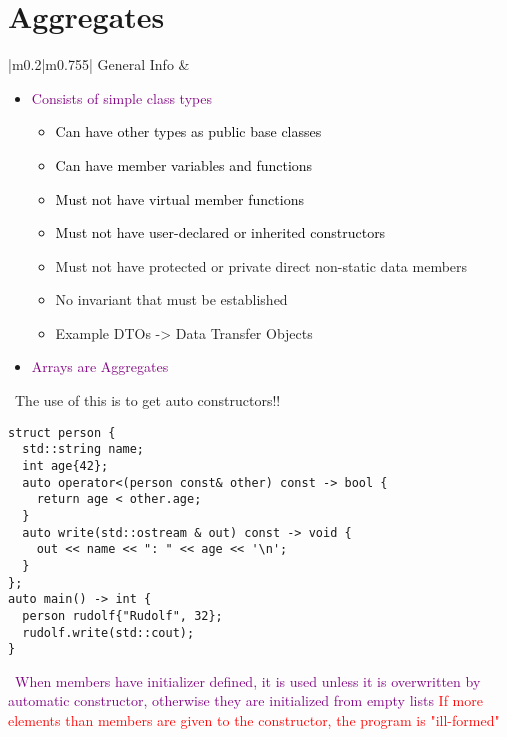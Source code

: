 \documentclass[main.tex,fontsize=8pt,paper=a4,paper=portrait,DIV=calc,]{scrartcl}
\begin{document}
\begin{table}[ht!]
\section{Aggregates}
\begin{tabular}{|m{0.2\linewidth}|m{0.755\linewidth}|}
\hline
General Info &
\vspace{2mm}
\begin{itemize}
\item \textcolor{purple}{Consists of simple class types}\newline
  \begin{itemize}
  \item \textcolor{black}{Can have other types as public base classes}
  \item \textcolor{black}{Can have member variables and functions}
  \item \textcolor{black}{Must not have virtual member functions}
  \item \textcolor{black}{Must not have user-declared or inherited constructors}
  \item Must not have protected or private direct non-static data members
  \item No invariant that must be established
  \item Example DTOs -> Data Transfer Objects
  \end{itemize} 
\item \textcolor{purple}{Arrays are Aggregates}
\vspace{-3mm}
\end{itemize}
\, \newline
The use of this is to get auto constructors!! \newline
\begin{lstlisting}
struct person {
  std::string name;
  int age{42};
  auto operator<(person const& other) const -> bool {
    return age < other.age;
  }
  auto write(std::ostream & out) const -> void {
    out << name << ": " << age << '\n';
  }
};
auto main() -> int {
  person rudolf{"Rudolf", 32};
  rudolf.write(std::cout);
}
\end{lstlisting}
\, \newline
\textcolor{purple}{When members have initializer defined, it is used unless it is overwritten by automatic constructor, otherwise they are initialized from empty lists}\newline
\textcolor{red}{If more elements than members are given to the constructor, the program is "ill-formed"}\\
\hline
\end{tabular}

\end{table}
\end{document}
